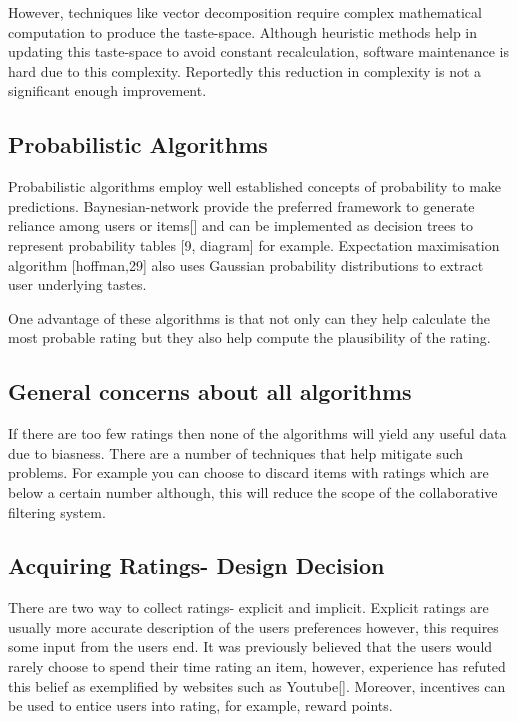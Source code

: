 However, techniques like vector decomposition require complex mathematical computation to produce the taste-space. Although heuristic methods help in updating this taste-space to avoid constant recalculation, software maintenance is hard due to this complexity. Reportedly this reduction in complexity is not a significant enough improvement.

\subsection{Probabilistic Algorithms}

Probabilistic algorithms employ well established concepts of probability to make predictions. Baynesian-network provide the preferred framework to generate reliance among users or items[] and can be implemented as decision trees to represent probability tables [9, diagram] for example. 
Expectation maximisation algorithm [hoffman,29] also uses Gaussian probability distributions to extract user underlying tastes.

One advantage of these algorithms is that not only can they help calculate the most probable rating but they also help compute the plausibility of the rating.

\subsection{General concerns about all algorithms}

If there are too few ratings then none of the algorithms will yield any useful data due to biasness. There are a number of techniques that help mitigate such problems. For example you can choose to discard items with ratings which are below a certain number although, this will reduce the scope of the collaborative filtering system.

\subsection{Acquiring Ratings- Design Decision}

There are two way to collect ratings- explicit and implicit. Explicit ratings are usually more accurate description of the users preferences however, this requires some input from the users end. It was previously believed that the users would rarely choose to spend their time rating an item, however, experience has refuted this belief as exemplified by websites such as Youtube[]. Moreover, incentives can be used to entice users into rating, for example, reward points.

